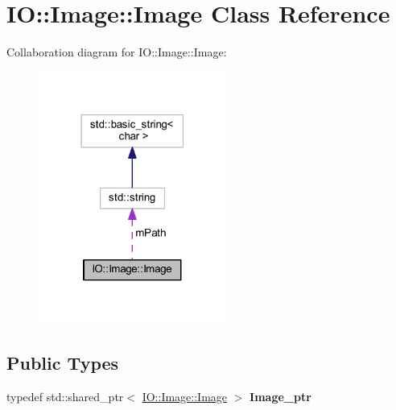 \hypertarget{class_i_o_1_1_image_1_1_image}{}\section{IO\+:\+:Image\+:\+:Image Class Reference}
\label{class_i_o_1_1_image_1_1_image}


Collaboration diagram for IO\+:\+:Image\+:\+:Image\+:
\nopagebreak
\begin{figure}[H]
\begin{center}
\leavevmode
\includegraphics[width=175pt]{class_i_o_1_1_image_1_1_image__coll__graph}
\end{center}
\end{figure}
\subsection*{Public Types}
\begin{DoxyCompactItemize}
\item 
typedef std\+::shared\+\_\+ptr$<$ \hyperlink{class_i_o_1_1_image_1_1_image}{I\+O\+::\+Image\+::\+Image} $>$ {\bfseries Image\+\_\+ptr}\hypertarget{class_i_o_1_1_image_1_1_image_a2278b8aad75cd25274b860851cfa3327}{}\label{class_i_o_1_1_image_1_1_image_a2278b8aad75cd25274b860851cfa3327}

\end{DoxyCompactItemize}
